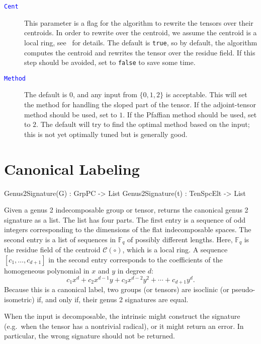 \documentclass{documentation}
\begin{document}
\begin{description}
\item[\textcolor{blue}{\tt Cent}]
This parameter is a flag for the algorithm to rewrite the tensors over their centroids. In order to rewrite over the centroid, we assume the centroid is a local ring, see~\cite{TensorSpacePackage} for details. The default is \texttt{true}, so by default, the algorithm computes the centroid and rewrites the tensor over the residue field.
If this step should be avoided, set to \texttt{false} to save some time.
\item[\textcolor{blue}{\tt Method}]
The default is $0$, and any input from $\{ 0,1,2\}$ is acceptable. 
This will set the method for handling the sloped part of the tensor.
If the adjoint-tensor method should be used, set to $1$. If the Pfaffian method should be used, set to $2$. The default will try to find the optimal method based on the input; this is not yet optimally tuned but is generally good.
\end{description}




\chapter{Canonical Labeling}

\begin{intrinsics}
Genus2Signature(G) : GrpPC -> List
Genus2Signature(t) : TenSpcElt -> List
\end{intrinsics}

Given a genus 2 indecomposable group or tensor, returns the canonical genus 2 signature as a list. 
The list has four parts.
The first entry is a sequence of odd integers corresponding to the dimensions of the flat indecomposable spaces.
The second entry is a list of sequences in $\mathbb{F}_q$ of possibly different lengths. Here, $\mathbb{F}_q$ is the residue field of the centroid $\mathcal{C}(\circ)$, which is a local ring. 
A sequence $[c_1,\dots, c_{d+1}]$ in the second entry corresponds to the coefficients of the homogeneous polynomial in $x$ and $y$ in degree $d$:
\[ c_1x^d + c_2 x^{d-1}y + c_3 x^{d-2}y^2 + \cdots + c_{d+1}y^d. \]
Because this is a canonical label, two groups (or tensors) are isoclinic (or pseudo-isometric) if, and only if, their genus 2 signatures are equal. 

When the input is decomposable, the intrinsic might construct the signature (e.g.\ when the tensor has a nontrivial radical), or it might return an error. In particular, the wrong signature should not be returned. 
\end{document}
